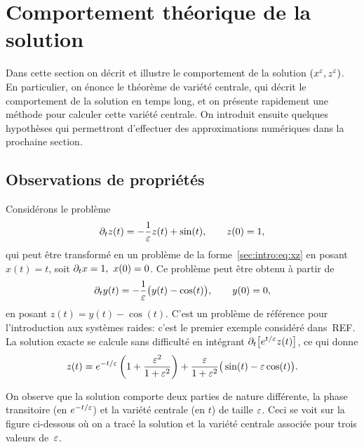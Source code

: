 \section*{Comportement théorique de la solution}

Dans cette section on décrit et illustre le comportement de la solution $(x^{\varepsilon}, z^{\varepsilon})$. En particulier, on énonce le théorème de variété centrale, qui décrit le comportement de la solution en temps long, et on présente rapidement une méthode pour calculer cette variété centrale. On introduit ensuite quelques hypothèses qui permettront d'effectuer des approximations numériques dans la prochaine section. 


\subsection*{Observations de propriétés}


Considérons le problème
\begin{equation} \label{sec:intro:pb:z_sin}
    \partial_t z(t) = -\frac{1}{\varepsilon}z(t) + \sin(t), 
    \qquad
    z(0) = 1, 
\end{equation}
qui peut être transformé en un problème de la forme~\eqref{sec:intro:eq:xz} en posant $x(t) = t$, soit $\partial_t x = 1,\ x(0) = 0$. Ce problème peut être obtenu à partir de 
\begin{equation*}
    \partial_t y(t) = -\frac{1}{\varepsilon} \big( y(t) - \cos(t) \big), 
    \qquad
    y(0) = 0, 
\end{equation*}
en posant $z(t) = y(t) - \cos(t)$. C'est un problème de référence pour l'introduction aux systèmes raides: c'est le premier exemple considéré dans~REF. La solution exacte se calcule sans difficulté en intégrant $\partial_t \big[ e^{t/\varepsilon} z(t) \big]$, ce qui donne 
\begin{equation} \label{sec:intro:sol:z_sin}
    z(t) = e^{-t/\varepsilon} \left( 1 + \frac{\varepsilon^2}{1+\varepsilon^2} \right)
        + \frac{\varepsilon}{1 + \varepsilon^2} \big( \sin(t) - \varepsilon \cos(t) \big) .
\end{equation}

On observe que la solution comporte deux parties de nature différente, la phase transitoire (en $e^{-t/\varepsilon}$) et la variété centrale (en $t$) de taille $\varepsilon$. Ceci se voit sur la figure ci-dessous où on a tracé la solution et la variété centrale associée pour trois valeurs de~$\varepsilon$. 

